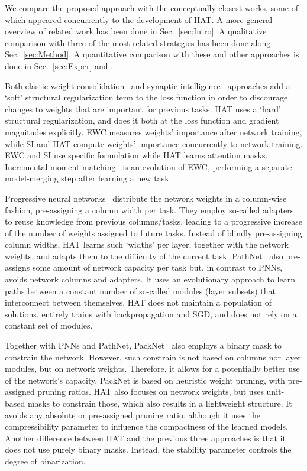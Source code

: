 We compare the proposed approach with the conceptually closest works, some of which appeared concurrently to the development of HAT. A more general overview of related work has been done in Sec.~\ref{sec:Intro}. A qualitative comparison with three of the most related strategies has been done along Sec.~\ref{sec:Method}. A quantitative comparison with these and other approaches is done in Sec.~\ref{sec:Exper} and . 

Both elastic weight consolidation~\citep[EWC;][]{Kirkpatrick17PNAS} and synaptic intelligence~\citep[SI;][]{Zenke17ICML} approaches add a `soft' structural regularization term to the loss function in order to discourage changes to weights that are important for previous tasks. HAT uses a `hard' structural regularization, and does it both at the loss function and gradient magnitudes explicitly. EWC measures weights' importance after network training, while SI and HAT compute weights' importance concurrently to network training. EWC and SI use specific formulation while HAT learns attention masks. Incremental moment matching~\citep[IMM;][]{Lee17NIPS} is an evolution of EWC, performing a separate model-merging step after learning a new task.

Progressive neural networks~\citep[PNNs;][]{Rusu16ARXIV} distribute the network weights in a column-wise fashion, pre-assigning a column width per task. They employ so-called adapters to reuse knowledge from previous columns/tasks, leading to a progressive increase of the number of weights assigned to future tasks. Instead of blindly pre-assigning column widths, HAT learns such `widths' per layer, together with the network weights, and adapts them to the difficulty of the current task.
PathNet~\cite{Fernando17ARXIV} also pre-assigns some amount of network capacity per task but, in contrast to PNNs, avoids network columns and adapters. It uses an evolutionary approach to learn paths between a constant number of so-called modules (layer subsets) that interconnect between themselves. HAT does not maintain a population of solutions, entirely trains with backpropagation and SGD, and does not rely on a constant set of modules. 

Together with PNNs and PathNet, PackNet~\cite{Mallya17ARXIV} also employs a binary mask to constrain the network. However, such constrain is not based on columns nor layer modules, but on network weights. Therefore, it allows for a potentially better use of the network's capacity. PackNet is based on heuristic weight pruning, with pre-assigned pruning ratios. HAT also focuses on network weights, but uses unit-based masks to constrain those, which also results in a lightweight structure. It avoids any absolute or pre-assigned pruning ratio, although it uses the compressibility parameter  to influence the compactness of the learned models. Another difference between HAT and the previous three approaches is that it does not use purely binary masks. Instead, the stability parameter  controls the degree of binarization.


